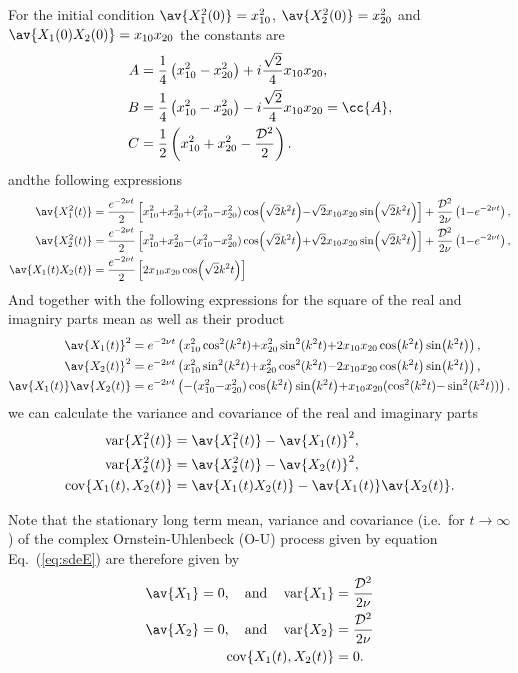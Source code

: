 \documentclass[10pt,a4paper]{article}
\newcommand{\eq}[1]{Eq.~(\ref{#1})}
\newcommand{\src}{\ensuremath{\mathcal{D}}}
\newcommand{\var}[1]{\ensuremath{\mathop{\mathrm{var}}\{#1\}}}
\newcommand{\cov}[1]{\ensuremath{\mathop{\mathrm{cov}}\{#1\}}}
\newcommand{\OU}{\renewcommand{\OU}{O-U\xspace}Ornstein-Uhlenbeck (O-U)\xspace}
\begin{document}
For the initial condition $\av{X_1^2(0)}=x_{10}^2$,
$\av{X_2^2(0)}=x_{20}^2$ and $\av{X_1(0)X_2(0)}=x_{10}x_{20}$
the constants are 
\begin{align}
A &= \frac{1}{4}\left(x_{10}^2-x_{20}^2\right)
+i\frac{\sqrt{2}}{4}x_{10}x_{20},\\
B &= \frac{1}{4}\left(x_{10}^2-x_{20}^2\right)
-i\frac{\sqrt{2}}{4}x_{10}x_{20} = \cc{A},\\
C &= \frac{1}{2}\left(x_{10}^2+x_{20}^2-\frac{\src^2}{2}\right).
\end{align}
andthe following expressions
\begin{align}
\av{X_1^2(t)} &= \frac{e^{-2\nu t}}{2}\left[x_{10}^2{+}x_{20}^2{+}
(x_{10}^2{-}x_{20}^2)\cos(\sqrt{2}k^2t){-}\sqrt{2}x_{10}x_{20}\sin(\sqrt{2}k^2t)
\right]+
\frac{\src^2}{2\nu}\left(1{-}e^{-2\nu t}\right),\\
\av{X_2^2(t)} &= \frac{e^{-2\nu t}}{2}\left[x_{10}^2{+}x_{20}^2{-}
(x_{10}^2{-}x_{20}^2)\cos(\sqrt{2}k^2t){+}\sqrt{2}x_{10}x_{20}\sin(\sqrt{2}k^2t)
\right]+
\frac{\src^2}{2\nu}\left(1{-}e^{-2\nu t}\right),\\
\av{X_1(t)X_2(t)} &= \frac{e^{-2\nu t}}{2}\left[
2x_{10}x_{20}\cos(\sqrt{2}k^2t)
\right]
\end{align}
And together with the following expressions for the square of the real and
imagniry parts mean  as well as their product
\begin{align}
\av{X_1(t)}^2 &= e^{-2\nu t}\left(
x_{10}^2\cos^2(k^2t){+}x_{20}^2\sin^2(k^2t){+}
2x_{10}x_{20}\cos(k^2t)\sin(k^2t) \right),\\
\av{X_2(t)}^2 &= e^{-2\nu t}\left(
x_{10}^2\sin^2(k^2t){+}x_{20}^2\cos^2(k^2t){-}
2x_{10}x_{20}\cos(k^2t)\sin(k^2t) \right),\\
\av{X_1(t)}\av{X_2(t)} &= e^{-2\nu t}\left(
{-}(x_{10}^2{-}x_{20}^2)\cos(k^2t)\sin(k^2t){+}x_{10}x_{20}
(\cos^2(k^2t){-}\sin^2(k^2t))\right).
\end{align}
we can calculate the variance and covariance of the real and imaginary parts 
\begin{align}
\var{X_1^2(t)} &= \av{X_1^2(t)}-\av{X_1(t)}^2,\\
\var{X_2^2(t)} &= \av{X_2^2(t)}-\av{X_2(t)}^2,\\
\cov{X_1(t),X_2(t)} &= \av{X_1(t)X_2(t)}-\av{X_1(t)}\av{X_2(t)}.
\end{align}

Note that the stationary long term mean, variance and covariance 
(i.e.\ for $t\rightarrow\infty$) of the complex \OU process given
by equation \eq{eq:sdeE} are therefore given by 
\begin{align}
\av{X_1} = 0,\quad\text{and}\quad\var{X_1} &= \frac{\src^2}{2\nu}\\
\av{X_2} = 0,\quad\text{and}\quad\var{X_2} &= \frac{\src^2}{2\nu}\\
\cov{X_1(t),X_2(t)} &= 0.
\end{align}
\end{document}

